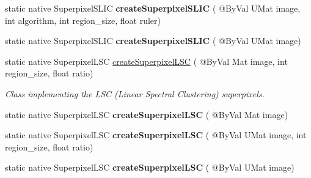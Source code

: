 \begin{DoxyCompactItemize}
\item 
static native Superpixel\+S\+L\+IC {\bfseries create\+Superpixel\+S\+L\+IC} ( @By\+Val U\+Mat image, int algorithm, int region\+\_\+size, float ruler)
\item 
static native Superpixel\+S\+L\+IC {\bfseries create\+Superpixel\+S\+L\+IC} ( @By\+Val U\+Mat image)
\item 
static native Superpixel\+L\+SC \hyperlink{group__ximgproc__superpixel_ga8bf6750a423a7f806993324e9b1a2276}{create\+Superpixel\+L\+SC} ( @By\+Val Mat image, int region\+\_\+size, float ratio)
\begin{DoxyCompactList}\small\item\em Class implementing the L\+SC (Linear Spectral Clustering) superpixels. \end{DoxyCompactList}\item 
static native Superpixel\+L\+SC {\bfseries create\+Superpixel\+L\+SC} ( @By\+Val Mat image)
\item 
static native Superpixel\+L\+SC {\bfseries create\+Superpixel\+L\+SC} ( @By\+Val U\+Mat image, int region\+\_\+size, float ratio)
\item 
static native Superpixel\+L\+SC {\bfseries create\+Superpixel\+L\+SC} ( @By\+Val U\+Mat image)
\end{DoxyCompactItemize}
